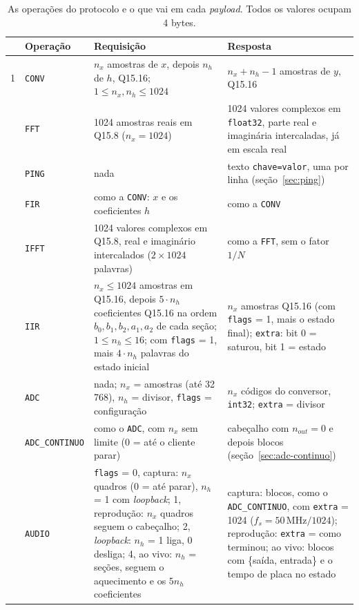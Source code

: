 \begin{table}[htbp]
  \centering
  \small
  \caption{As operações do protocolo e o que vai em cada \emph{payload}. Todos
    os valores ocupam 4 bytes.}
  \label{tab:opcodes}
  \begin{tabularx}{\textwidth}{@{}clXX@{}}
    \toprule
    & \textbf{Operação} & \textbf{Requisição} & \textbf{Resposta} \\
    \midrule
    1 & \texttt{CONV} & \(n_x\) amostras de \(x\), depois \(n_h\) de \(h\),
      Q15.16; \(1 \le n_x, n_h \le 1024\)
      & \(n_x + n_h - 1\) amostras de \(y\), Q15.16 \\
    \addlinespace
    2 & \texttt{FFT} & 1024 amostras reais em Q15.8 (\(n_x = 1024\))
      & 1024 valores complexos em \texttt{float32}, parte real e imaginária
        intercaladas, já em escala real \\
    \addlinespace
    3 & \texttt{PING} & nada & texto \texttt{chave=valor}, uma por linha
      (seção~\ref{sec:ping}) \\
    \addlinespace
    4 & \texttt{FIR} & como a \texttt{CONV}: \(x\) e os coeficientes \(h\)
      & como a \texttt{CONV} \\
    \addlinespace
    5 & \texttt{IFFT} & 1024 valores complexos em Q15.8, real e imaginário
      intercalados (\(2 \times 1024\) palavras)
      & como a \texttt{FFT}, sem o fator \(1/N\) \\
    \addlinespace
    6 & \texttt{IIR} & \(n_x \le 1024\) amostras em Q15.16, depois
      \(5 \cdot n_h\) coeficientes Q15.16 na ordem
      \(b_0, b_1, b_2, a_1, a_2\) de cada seção; \(1 \le n_h \le 16\);
      com \texttt{flags} = 1, mais \(4 \cdot n_h\) palavras do estado inicial
      & \(n_x\) amostras Q15.16 (com \texttt{flags} = 1, mais o estado final);
        \texttt{extra}: bit 0 = saturou, bit 1 = estado \\
    \addlinespace
    7 & \texttt{ADC} & nada; \(n_x\) = amostras (até 32\,768), \(n_h\) =
      divisor, \texttt{flags} = configuração
      & \(n_x\) códigos do conversor, \texttt{int32}; \texttt{extra} = divisor \\
    \addlinespace
    8 & \texttt{ADC\_CONTINUO} & como o \texttt{ADC}, com \(n_x\) sem limite
      (0 = até o cliente parar)
      & cabeçalho com \(n_{out} = 0\) e depois blocos
        (seção~\ref{sec:adc-continuo}) \\
    \addlinespace
    9 & \texttt{AUDIO} & \texttt{flags} = 0, captura: \(n_x\) quadros (0 = até
      parar), \(n_h\) = 1 com \emph{loopback}; 1, reprodução: \(n_x\) quadros
      seguem o cabeçalho; 2, \emph{loopback}: \(n_h\) = 1 liga, 0 desliga;
      4, ao vivo: \(n_h\) = seções, seguem o aquecimento e os
      \(5 n_h\) coeficientes
      & captura: blocos, como o \texttt{ADC\_CONTINUO}, com
        \texttt{extra} = 1024 (\(f_s = 50\,\text{MHz}/1024\)); reprodução:
        \texttt{extra} = como terminou; ao vivo: blocos com
        \{saída, entrada\} e o tempo de placa no estado \\
    \bottomrule
  \end{tabularx}
\end{table}

